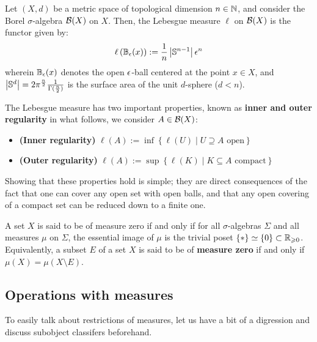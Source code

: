         \begin{example}
            Let $(X,d)$ be a metric space of topological dimension $n \in \mathbb{N}$, and consider the Borel $\sigma$-algebra $\mathcal{B}(X)$ on $X$. Then, the Lebesgue measure $\ell$ on $\mathcal{B}(X)$ is the functor given by:
                $$\ell\left(\mathbb{B}_{\epsilon}(x)\right) := \frac1n \left|\mathbb{S}^{n-1}\right| \epsilon^n$$
            wherein $\mathbb{B}_{\epsilon}(x)$ denotes the open $\epsilon$-ball centered at the point $x \in X$, and $\left|\mathbb{S}^d\right| = 2\pi^{\frac{n}{2}} \frac{1}{\Gamma(\frac{n}{2})}$ is the surface area of the unit $d$-sphere ($d < n$).

            The Lebesgue measure has two important properties, known as \textbf{inner and outer regularity} in what follows, we consider $A \in \mathcal{B}(X)$:
                \begin{itemize}
                    \item \textbf{(Inner regularity)} $\ell(A) := \inf\left\{\ell(U) \mid \text{$U \supseteq A$ open}\right\}$
                    \item \textbf{(Outer regularity)} $\ell(A) := \sup\left\{\ell(K) \mid \text{$K \subseteq A$ compact}\right\}$
                \end{itemize}
            Showing that these properties hold is simple; they are direct consequences of the fact that one can cover any open set with open balls, and that any open covering of a compact set can be reduced down to a finite one.
        \end{example}
        \begin{example}
            
        \end{example}
        \begin{definition} \label{def: measure_zero_set}
            A set $X$ is said to be of measure zero if and only if for all $\sigma$-algebras $\Sigma$ and all measures $\mu$ on $\Sigma$, the essential image of $\mu$ is the trivial poset $\{*\} \simeq \{0\} \subset \mathbb{R}_{\geqslant 0}$. Equivalently, a subset $E$ of a set $X$ is said to be of \textbf{measure zero} if and only if $\mu(X) = \mu(X \setminus E)$.
        \end{definition}

    \subsection{Operations with measures}
        To easily talk about restrictions of measures, let us have a bit of a digression and discuss subobject classifers beforehand.
        
